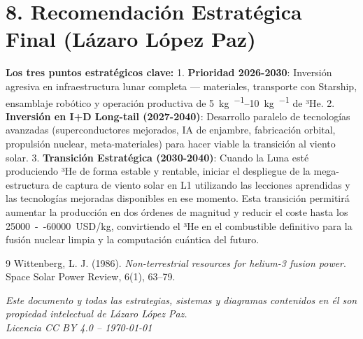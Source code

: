 \documentclass[11pt,a4paper]{article}
\begin{document}
\section{8. Recomendación Estratégica Final (Lázaro López Paz)}
\textbf{Los tres puntos estratégicos clave:}
1. \textbf{Prioridad 2026-2030}: Inversión agresiva en infraestructura lunar completa — materiales, transporte con Starship, ensamblaje robótico y operación productiva de \SIrange{5}{10}{\kilo\gram\per\year} de ³He.
2. \textbf{Inversión en I+D Long-tail (2027-2040)}: Desarrollo paralelo de tecnologías avanzadas (superconductores mejorados, IA de enjambre, fabricación orbital, propulsión nuclear, meta-materiales) para hacer viable la transición al viento solar.
3. \textbf{Transición Estratégica (2030-2040)}: Cuando la Luna esté produciendo ³He de forma estable y rentable, iniciar el despliegue de la mega-estructura de captura de viento solar en L1 utilizando las lecciones aprendidas y las tecnologías mejoradas disponibles en ese momento.
Esta transición permitirá aumentar la producción en dos órdenes de magnitud y reducir el coste hasta los \SI{25000}{--}\SI{60000}{USD/kg}, convirtiendo el ³He en el combustible definitivo para la fusión nuclear limpia y la computación cuántica del futuro.
\begin{thebibliography}{9}
Wittenberg, L. J. (1986). \textit{Non-terrestrial resources for helium-3 fusion power}. Space Solar Power Review, 6(1), 63--79.
\end{thebibliography}
\vfill
\begin{center}
\small
\textit{Este documento y todas las estrategias, sistemas y diagramas contenidos en él son propiedad intelectual de Lázaro López Paz.} \\
\textit{Licencia CC BY 4.0 -- \today}
\end{center}
\end{document}
